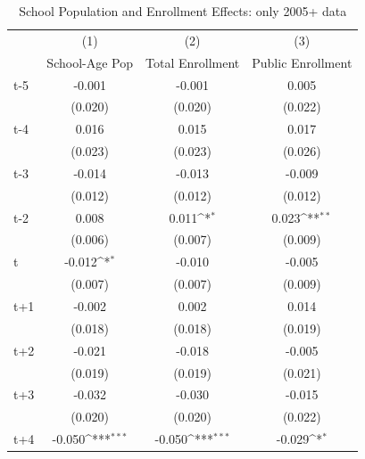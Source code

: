 \begin{table}[htbp]\centering
\def\sym#1{\ifmmode^{#1}\else\(^{#1}\)\fi}
\caption{School Population and Enrollment Effects: only 2005+ data}
\begin{tabular}{l*{3}{c}}
\hline\hline
            &\multicolumn{1}{c}{(1)}&\multicolumn{1}{c}{(2)}&\multicolumn{1}{c}{(3)}\\
            &\multicolumn{1}{c}{School-Age Pop}&\multicolumn{1}{c}{Total Enrollment}&\multicolumn{1}{c}{Public Enrollment}\\
\hline
t-5         &      -0.001         &      -0.001         &       0.005         \\
            &     (0.020)         &     (0.020)         &     (0.022)         \\
[1em]
t-4         &       0.016         &       0.015         &       0.017         \\
            &     (0.023)         &     (0.023)         &     (0.026)         \\
[1em]
t-3         &      -0.014         &      -0.013         &      -0.009         \\
            &     (0.012)         &     (0.012)         &     (0.012)         \\
[1em]
t-2         &       0.008         &       0.011\sym{*}  &       0.023\sym{**} \\
            &     (0.006)         &     (0.007)         &     (0.009)         \\
[1em]
t           &      -0.012\sym{*}  &      -0.010         &      -0.005         \\
            &     (0.007)         &     (0.007)         &     (0.009)         \\
[1em]
t+1         &      -0.002         &       0.002         &       0.014         \\
            &     (0.018)         &     (0.018)         &     (0.019)         \\
[1em]
t+2         &      -0.021         &      -0.018         &      -0.005         \\
            &     (0.019)         &     (0.019)         &     (0.021)         \\
[1em]
t+3         &      -0.032         &      -0.030         &      -0.015         \\
            &     (0.020)         &     (0.020)         &     (0.022)         \\
[1em]
t+4         &      -0.050\sym{***}&      -0.050\sym{***}&      -0.029\sym{*}  \\

\end{tabular}
\end{table}

